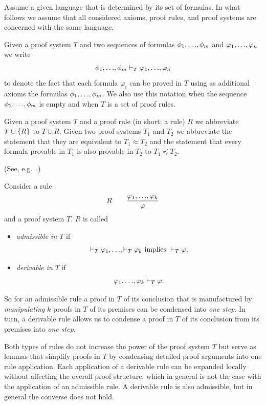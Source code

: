 \documentclass[runningheads]{llncs}       %
\begin{document}
Assume a given language that is determined by its set of formulas.  In
what follows we assume that all considered axioms, proof rules, and
proof systems are concerned with the same language.

Given a proof system $T$ and two sequences of formulas
$\phi_1, \mbox{$\ldots$}, \phi_m$ and $\varphi_1, \mbox{$\ldots$}, \varphi_n$ we write
\[
  \phi_1, \mbox{$\ldots$}, \phi_m \vdash_T \varphi_1, \mbox{$\ldots$}, \varphi_n
\]
to denote the fact that each formula $\varphi_i$ can be proved in
$T$ using as additional axioms the formulas
$\phi_1, \mbox{$\ldots$}, \phi_m$.  We also use this notation when the sequence
$\phi_1, \mbox{$\ldots$}, \phi_m$ is empty and when $T$ is a set of proof
rules.

Given a proof system $T$ and a proof rule (in short: a rule) $R$ we
abbreviate $T \cup \mbox{$\{{R}\}$}$ to $T \cup R$. Given two proof systems $T_1$
and $T_2$ we abbreviate the statement that they are equivalent to
$T_1 \approx T_2$ and the statement that every formula provable in
$T_1$ is also provable in $T_2$ to $T_1 \preceq T_2$.

\begin{definition}(See, e.g.~\cite[page 47]{Pla13}.)
  
  Consider a rule
  \[ 
  R \qquad \frac{\varphi_1,\mbox{$\ldots$},\varphi_k}{\varphi}
\]
and a proof system $T$. $R$ is called
\begin{itemize}
\item \emph{admissible in $T$} if 
\[
 \vdash_T \varphi_1, \mbox{$\ldots$}, \vdash_T \varphi_k
 \mbox{ implies }
 \vdash_T \varphi,
\]

\item \emph{derivable in $T$} if 
\[
 \varphi_1, \mbox{$\ldots$}, \varphi_k \vdash_T \varphi.
\]

\end{itemize}

\end{definition}

So for an admissible rule a proof in $T$ of its conclusion 
that is manufactured by \emph{manipulating} $k$ proofs in $T$ 
of its premises can be condensed into \emph{one step}. 
In turn, a derivable rule allows us to condense a proof in $T$ of
its conclusion from its premises into \emph{one step}.

Both types of rules do not increase the power of the proof system $T$
but serve as lemmas that simplify proofs in $T$ by condensing detailed
proof arguments into one rule application.  Each application of a
derivable rule can be expanded locally without affecting the overall
proof structure, which in general is not the case with the application
of an admissible rule.  A derivable rule is also admissible, but in
general the converse does not hold.
\end{document}
